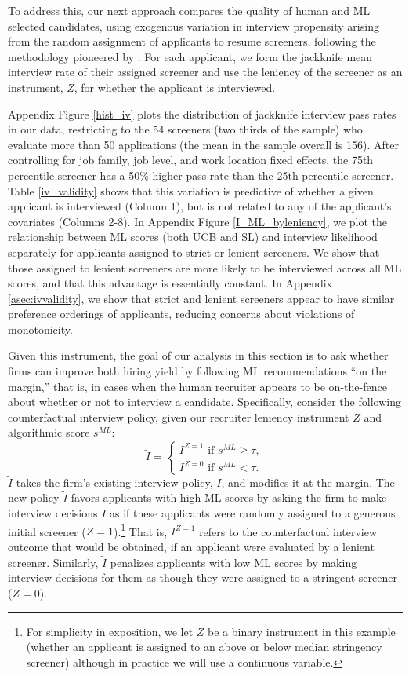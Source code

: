 \documentclass[crop,noquery,editorname,historyrev,nosurname,runningno,sepcount]{RESTUD}
\begin{document}
To address this, our next approach compares the quality of human and ML selected candidates, using exogenous variation in interview propensity arising from the random assignment of applicants to resume screeners, following the methodology pioneered by \citet{kling2006}. For each applicant, we form the jackknife mean interview rate of their assigned screener and use the leniency of the screener as an instrument, $Z$, for whether the applicant is interviewed. 


Appendix Figure \ref{hist_iv} plots the distribution of jackknife interview pass rates in our data, restricting to the 54 screeners (two thirds of the sample) who evaluate more than 50 applications (the mean in the sample overall is 156).  After controlling for job family, job level, and work location fixed effects, the 75th percentile screener has a 50\% higher pass rate than the 25th percentile screener.  Table \ref{iv_validity} shows that this variation is predictive of whether a given applicant is interviewed (Column 1), but is not related to any of the applicant's covariates (Columns 2-8).   In Appendix Figure \ref{I_ML_byleniency}, we plot the relationship between ML scores (both UCB and SL) and interview likelihood separately for applicants assigned to strict or lenient screeners.  We show that those assigned to lenient screeners are more likely to be interviewed across all ML scores, and that this advantage is essentially constant. In Appendix \ref{asec:ivvalidity}, we show that strict and lenient screeners appear to have similar preference orderings of applicants, reducing concerns about violations of monotonicity.

Given this instrument, the goal of our analysis in this section is to ask whether firms can improve both hiring yield by following ML recommendations ``on the margin,'' that is, in cases when the human recruiter appears to be on-the-fence about whether or not to interview a candidate.  Specifically, consider the following counterfactual interview policy, given our recruiter leniency instrument $Z$ and algorithmic score $s^{ML}$:
$$
\tilde{I}=
\begin{cases}
I^{Z=1} \text{ if } s^{ML} \geq \tau,\\
I^{Z=0} \text{ if } s^{ML} < \tau.
\end{cases}
$$
$\tilde{I}$ takes the firm's existing interview policy, $I$, and modifies it at the margin. The new policy $\tilde{I}$ favors applicants with high ML scores by asking the firm to make interview decisions $I$ as if these applicants were randomly assigned to a generous initial screener ($Z=1$).\footnote{For simplicity in exposition, we let $Z$ be a binary instrument in this example (whether an applicant is assigned to an above or below median stringency screener) although in practice we will use a continuous variable.}  That is, $I^{Z=1}$ refers to the counterfactual interview outcome that would be obtained, if an applicant were evaluated by a lenient screener.  Similarly, $\tilde{I}$ penalizes applicants with low ML scores by making interview decisions for them as though they were assigned to a stringent screener ($Z=0$).  
\end{document}
